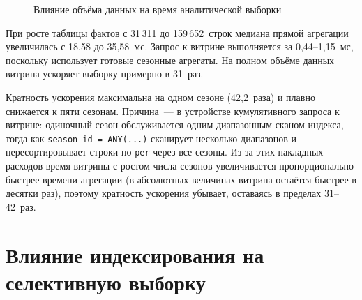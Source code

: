 \begin{figure}[H]
\centering
{}
\caption{Влияние объёма данных на время аналитической выборки}
\label{fig:volume-fact-vitrina}
\end{figure}

При росте таблицы фактов с 31\,311 до 159\,652~строк медиана прямой
агрегации увеличилась с 18{,}58 до 35{,}58~мс. Запрос к витрине выполняется
за 0{,}44--1{,}15~мс, поскольку использует готовые сезонные агрегаты.
На полном объёме данных витрина ускоряет выборку примерно в 31~раз.

Кратность ускорения максимальна на одном сезоне (42{,}2~раза) и плавно
снижается к пяти сезонам. Причина~--- в устройстве кумулятивного запроса
к витрине: одиночный сезон обслуживается одним диапазонным сканом индекса,
тогда как \texttt{season\_id = ANY(...)} сканирует несколько диапазонов
и пересортировывает строки по \texttt{per} через все сезоны. Из-за этих
накладных расходов время витрины с ростом числа сезонов увеличивается
пропорционально быстрее времени агрегации (в абсолютных величинах витрина
остаётся быстрее в десятки раз), поэтому кратность ускорения убывает,
оставаясь в пределах 31--42~раз.

\section{Влияние индексирования на селективную выборку}

